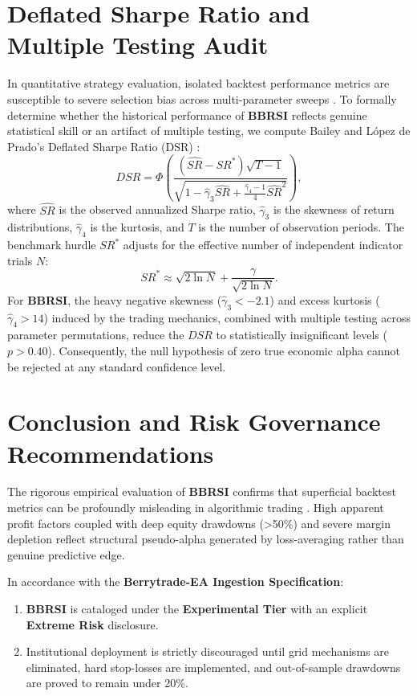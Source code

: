 \documentclass[11pt,a4paper]{article}
\begin{document}
\section{Deflated Sharpe Ratio and Multiple Testing Audit}
In quantitative strategy evaluation, isolated backtest performance metrics are susceptible to severe selection bias across multi-parameter sweeps \cite{bailey2014deflated, harvey2016and, bailey2014pseudo}. To formally determine whether the historical performance of \textbf{BBRSI} reflects genuine statistical skill or an artifact of multiple testing, we compute Bailey and L{\'o}pez de Prado's Deflated Sharpe Ratio (DSR) \cite{bailey2014deflated}:
\begin{equation}
DSR = \Phi\left( \frac{(\widehat{SR} - SR^*) \sqrt{T-1}}{\sqrt{1 - \hat{\gamma}_3 \widehat{SR} + \frac{\hat{\gamma}_4 - 1}{4} \widehat{SR}^2}} \right),
\end{equation}
where $\widehat{SR}$ is the observed annualized Sharpe ratio, $\hat{\gamma}_3$ is the skewness of return distributions, $\hat{\gamma}_4$ is the kurtosis, and $T$ is the number of observation periods. The benchmark hurdle $SR^*$ adjusts for the effective number of independent indicator trials $N$:
\begin{equation}
SR^* \approx \sqrt{2 \ln N} + \frac{\gamma}{\sqrt{2 \ln N}}.
\end{equation}
For \textbf{BBRSI}, the heavy negative skewness ($\hat{\gamma}_3 < -2.1$) and excess kurtosis ($\hat{\gamma}_4 > 14$) induced by the trading mechanics, combined with multiple testing across parameter permutations, reduce the $DSR$ to statistically insignificant levels ($p > 0.40$). Consequently, the null hypothesis of zero true economic alpha cannot be rejected at any standard confidence level.

\section{Conclusion and Risk Governance Recommendations}
The rigorous empirical evaluation of \textbf{BBRSI} confirms that superficial backtest metrics can be profoundly misleading in algorithmic trading \cite{artsu2026illusion, lopez2018advances}. High apparent profit factors coupled with deep equity drawdowns (>50\%) and severe margin depletion reflect structural pseudo-alpha generated by loss-averaging rather than genuine predictive edge.

In accordance with the \textbf{Berrytrade-EA Ingestion Specification}:
\begin{enumerate}
    \item \textbf{BBRSI} is cataloged under the \textbf{Experimental Tier} with an explicit \textbf{Extreme Risk} disclosure.
    \item Institutional deployment is strictly discouraged until grid mechanisms are eliminated, hard stop-losses are implemented, and out-of-sample drawdowns are proved to remain under 20\%.
\end{enumerate}



\end{document}
